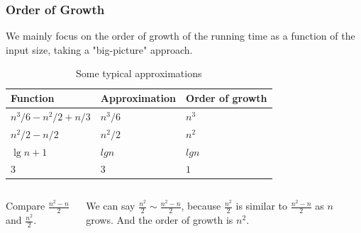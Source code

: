 \documentclass[aspectratio=169, 14pt]{beamer}
\begin{document}
\begin{frame}[fragile]
	\frametitle{Order of Growth}

	We mainly focus on the \alert{order of growth} of the running time as a function of the input size, taking a "big-picture" approach.

	\begin{table}
		\caption{Some typical approximations}
		\begin{tabular}{lll}
			\toprule
			Function              & Approximation & Order of growth \\
			\midrule
			$n^3/6 - n^2/2 + n/3$ & $n^3/6$       & $n^3$           \\
			$n^2/2 - n/2$         & $n^2/2$       & $n^2$           \\
			$\lg{n} + 1$          & $lg{n}$       & $lg{n}$         \\
			$3$                   & $3$           & $1$             \\
			\bottomrule
		\end{tabular}
	\end{table}
\end{frame}
\begin{frame}[fragile]

	\begin{columns}
		Compare $\frac{n^2 - n}{2}$ and $\frac{n^2}{2}$.

		We can say \alert{$\frac{n^2}{2} \sim \frac{n^2 - n}{2}$}, because $\frac{n^2}{2}$ is similar to $\frac{n^2 - n}{2}$ as $n$ grows. And the order of growth is $n^2$.

	\end{columns}
\end{frame}
\end{document}
